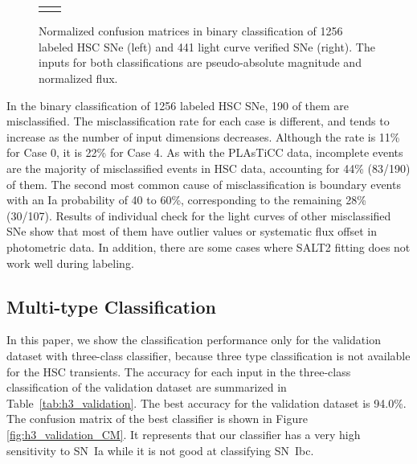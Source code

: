 \documentclass[useamsfonts]{pasj01}
\begin{document}
\begin{figure}[htbp]
\begin{tabular}{cc}
\begin{minipage}{0.5\hsize}
\begin{center}
            \end{center}
        \end{minipage}
    \end{tabular}
    \caption{%
  Normalized confusion matrices in binary classification of 1256 labeled HSC SNe (left) and 441 light curve verified SNe (right).
  The inputs for both classifications are pseudo-absolute magnitude and normalized flux.
}%
    \label{fig:h2_test_CM}
\end{figure}
%

In the binary classification of 1256 labeled HSC SNe, 190 of them are misclassified.
The misclassification rate for each case is different, and tends to increase as the number of input dimensions decreases.
Although the rate is 11\% for Case 0, it is 22\% for Case 4.
As with the PLAsTiCC data, incomplete events are the majority of misclassified events in HSC data, accounting for 44\% (83/190) of them.
The second most common cause of misclassification is boundary events with an Ia probability of 40 to 60\%, corresponding to the remaining 28\% (30/107).
Results of individual check for the light curves of other misclassified SNe show that most of them have outlier values or systematic flux offset in photometric data.
In addition, there are some cases where SALT2 fitting does not work well during labeling.

%
%
\subsection{Multi-type Classification}
\label{sec:h3}
%
In this paper, we show the classification performance only for the validation dataset with three-class classifier, because three type classification is not available for the HSC transients.
%
The accuracy for each input in the three-class classification of the validation dataset are summarized in Table\ \ref{tab:h3_validation}.
The best accuracy for the validation dataset is 94.0\%.
The confusion matrix of the best classifier is shown in Figure \ref{fig:h3_validation_CM}.
It represents that our classifier has a very high sensitivity to SN~Ia while it is not good at classifying SN~Ibc.
\end{document}
